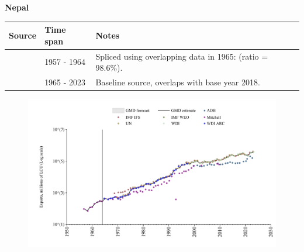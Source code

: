 \documentclass[12pt,a4paper,landscape]{article}
\begin{document}
\begin{adjustbox}{max totalsize={\paperwidth}{\paperheight},center}
\begin{minipage}[t][\textheight][t]{\textwidth}
\vspace*{0.5cm}
{}
\begin{center}
{\Large\bfseries Nepal}
\end{center}
\vspace{0.5cm}
\begin{table}[H]
\centering
\small
\begin{tabular}{|l|l|l|}
\hline
\textbf{Source} & \textbf{Time span} & \textbf{Notes} \\
\hline
\rowcolor{white}\cite{Mitchell}& 1957 - 1964 &Spliced using overlapping data in 1965: (ratio = 98.6\%).\\
\rowcolor{lightgray}\cite{WDI}& 1965 - 2023 &Baseline source, overlaps with base year 2018.\\
\hline
\end{tabular}
\end{table}
\begin{figure}[H]
\centering
\includegraphics[width=\textwidth,height=0.6\textheight,keepaspectratio]{graphs/NPL_exports.pdf}
\end{figure}
\end{minipage}
\end{adjustbox}
\end{document}
